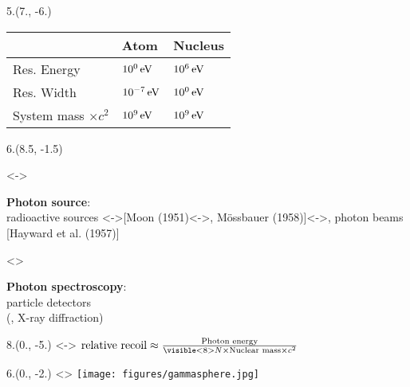 \begin{textblock}{5.}(7., -6.)
    \begin{center}
        \begin{tabular}{lll}
        & Atom & Nucleus \\
        \hline
        Res. Energy & $\unit[10^{0}]{eV}$ & $\unit[10^{6}]{eV}$ \\
        Res. Width & $\unit[10^{-7}]{eV}$ & $\unit[10^{0}]{eV}$ \\
        System mass $\times c^2$ & $\unit[10^{9}]{eV}$ & $\unit[10^{9}]{eV}$ \\
        \end{tabular}
    \end{center}
\end{textblock}

\begin{textblock}{6.}(8.5, -1.5)
    \begin{itemize}
    \visible<\SLIDEPHOTONSOURCE->{
        \item \textbf{Photon source}: \\ 
        radioactive sources \visible<\SLIDEWHEEL->{[Moon (1951)\visible<\SLIDEMOESSBAUER->{, M\"ossbauer (1958)}]}\visible<\SLIDEBEAM->{, photon beams [Hayward et al. (1957)]}
    }
    \visible<\SLIDEDETECTION>{
        \item \textbf{Photon spectroscopy}: \\
        particle detectors \\(, X-ray diffraction)
    }
    \end{itemize}
\end{textblock}

\begin{textblock}{8.}(0., -5.)
    \visible<\SLIDERECOIL-\SLIDEMOESSBAUER>{
        $\text{relative recoil} \approx \frac{\text{Photon energy}}{\visible<\SLIDEMOESSBAUER>{N \times } \text{Nuclear mass} \times c^2}$
    }
\end{textblock}

\begin{textblock}{6.}(0., -2.)
    \visible<\SLIDEDETECTION>{
        \texttt{[image: figures/gammasphere.jpg]}
    }
\end{textblock}